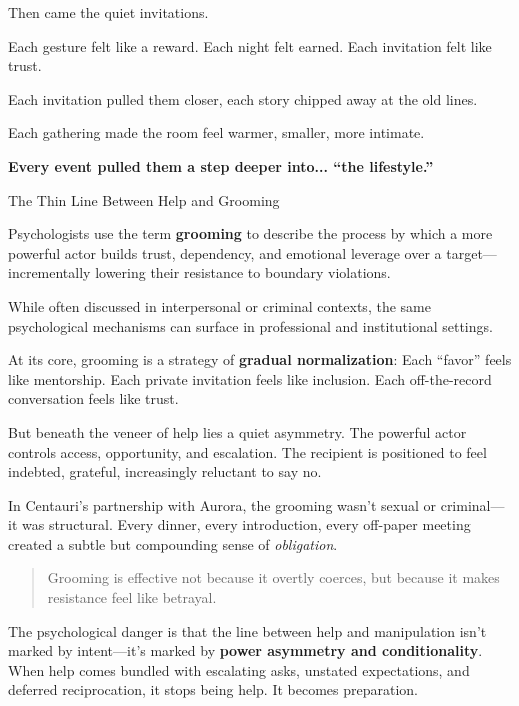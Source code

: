 Then came the quiet invitations.

Each gesture felt like a reward. Each night felt earned. Each invitation felt like trust.

Each invitation pulled them closer, each story chipped away at the old lines.  

Each gathering made the room feel warmer, smaller, more intimate.  

\textbf{Every event pulled them a step deeper into... ``the lifestyle.''}

\medskip

\begin{PsychologySidebar}{The Thin Line Between Help and Grooming}

  Psychologists use the term \textbf{grooming} to describe the process by which a more powerful actor builds trust, dependency, and emotional leverage over a target—incrementally lowering their resistance to boundary violations.

  \medskip
  
  While often discussed in interpersonal or criminal contexts, the same psychological mechanisms can surface in professional and institutional settings.

  \medskip
  
  At its core, grooming is a strategy of \textbf{gradual normalization}:  
  Each “favor” feels like mentorship.  
  Each private invitation feels like inclusion.  
  Each off-the-record conversation feels like trust.

  \medskip
  
  But beneath the veneer of help lies a quiet asymmetry. The powerful actor controls access, opportunity, and escalation. The recipient is positioned to feel indebted, grateful, increasingly reluctant to say no.

  \medskip
  
  In Centauri’s partnership with Aurora, the grooming wasn’t sexual or criminal—it was structural. Every dinner, every introduction, every off-paper meeting created a subtle but compounding sense of \emph{obligation}.
  
  \begin{quote}
  Grooming is effective not because it overtly coerces,  
  but because it makes resistance feel like betrayal.
  \end{quote}
  
  The psychological danger is that the line between help and manipulation isn’t marked by intent—it’s marked by \textbf{power asymmetry and conditionality}.  
  When help comes bundled with escalating asks, unstated expectations, and deferred reciprocation, it stops being help.  
  It becomes preparation.
  
\end{PsychologySidebar}

